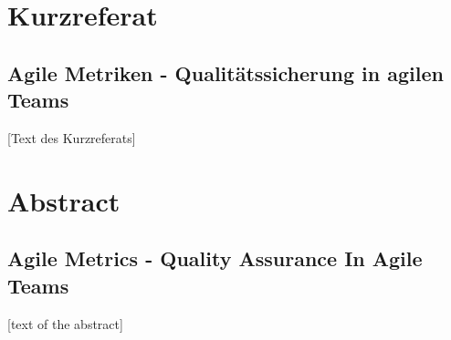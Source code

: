 \newpage
\section*{Kurzreferat}
\subsection*{Agile Metriken {-} Qualitätssicherung in agilen Teams}

[Text des Kurzreferats]


\newpage
\section*{Abstract}
\subsection*{Agile Metrics {-} Quality Assurance In Agile Teams}

[text of the abstract]
